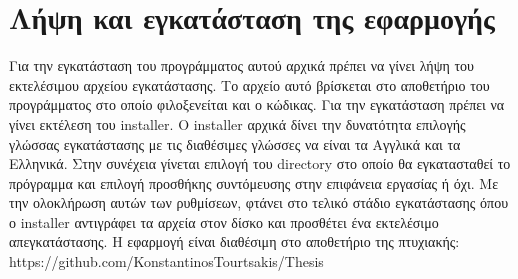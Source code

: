 







\section{Λήψη και εγκατάσταση της εφαρμογής}
Για την εγκατάσταση του προγράμματος αυτού αρχικά πρέπει να γίνει λήψη του εκτελέσιμου
αρχείου εγκατάστασης. Το αρχείο αυτό βρίσκεται στο αποθετήριο του προγράμματος στο οποίο
φιλοξενείται και ο κώδικας. Για την εγκατάσταση πρέπει να γίνει εκτέλεση του installer. Ο
installer αρχικά δίνει την δυνατότητα επιλογής γλώσσας εγκατάστασης με τις διαθέσιμες γλώσσες
να είναι τα Αγγλικά και τα Ελληνικά. Στην συνέχεια γίνεται επιλογή του directory στο οποίο θα
εγκατασταθεί το πρόγραμμα και επιλογή προσθήκης συντόμευσης στην επιφάνεια εργασίας ή όχι. Με
την ολοκλήρωση αυτών των ρυθμίσεων, φτάνει στο τελικό στάδιο εγκατάστασης όπου ο installer 
αντιγράφει τα αρχεία στον δίσκο και προσθέτει ένα εκτελέσιμο απεγκατάστασης. Η εφαρμογή είναι
διαθέσιμη στο αποθετήριο της πτυχιακής: https://github.com/KonstantinosTourtsakis/Thesis